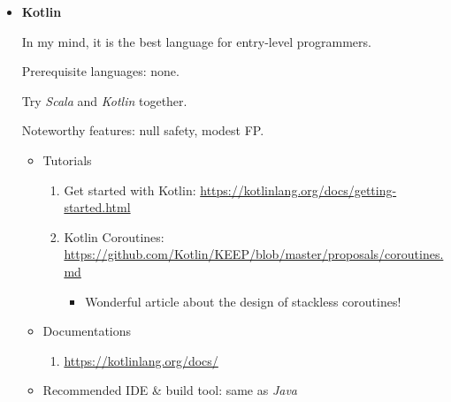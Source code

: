 \documentclass{article}
\begin{document}
\begin{itemize}
    \item \textbf{Kotlin}
    
    In my mind, it is the best language for entry-level programmers.
    
    Prerequisite languages: none.
    
    Try \emph{Scala} and \emph{Kotlin} together.
    
    Noteworthy features: null safety, modest FP.
    \begin{itemize}
        \item Tutorials
        \begin{enumerate}
            \item Get started with Kotlin:
            \href{https://kotlinlang.org/docs/getting-started.html}{https://kotlinlang.org/docs/getting-started.html}
            \item Kotlin Coroutines:\\
            \href{https://github.com/Kotlin/KEEP/blob/master/proposals/coroutines.md}{https://github.com/Kotlin/KEEP/blob/master/proposals/coroutines.md}
            \begin{itemize}
                \item Wonderful article about the design of stackless coroutines!
            \end{itemize}
        \end{enumerate}
        \item Documentations
        \begin{enumerate}
            \item        \href{https://kotlinlang.org/docs/}{https://kotlinlang.org/docs/}
        \end{enumerate}
        \item Recommended IDE \& build tool: same as \emph{Java}
    \end{itemize}
    

\end{itemize}
\end{document}
